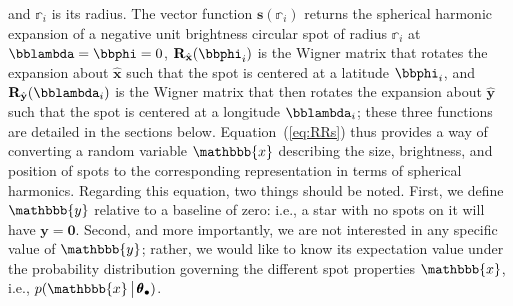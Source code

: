 \documentclass[modern]{aastex62}
\begin{document}
and $\mathbb{r}_i$ is its radius.
The vector function $\mathbf{s}(\mathbb{r}_i)$
returns the spherical harmonic expansion of a negative unit brightness
circular spot of radius $\mathbb{r}_i$ at $\bblambda = \bbphi = 0$,
$\mathbf{R}_{\hat{\mathbf{x}}}(\bbphi_i)$ is the Wigner matrix that rotates the
expansion about $\hat{\mathbf{x}}$ such that the spot is centered at a
latitude $\bbphi_i$, and $\mathbf{R}_{\hat{\mathbf{y}}}(\bblambda_i)$ is the Wigner
matrix that then rotates the
expansion about $\hat{\mathbf{y}}$ such that the spot is centered at a
longitude $\bblambda_i$; these three functions are detailed in the sections below.
%
Equation~(\ref{eq:RRs}) thus provides a way of converting a random variable
$\mathbbb{x}$ describing the size, brightness, and position of spots to the
corresponding representation in terms of spherical harmonics.
%
Regarding this equation,
two things should be noted. First, we define $\mathbbb{y}$ relative to
a baseline of zero: i.e., a star with no spots on it will have
$\mathbf{y} = \mathbf{0}$. Second, and more importantly,
we are not interested in any specific value of
$\mathbbb{y}$; rather, we would like to know its expectation value under
the probability distribution governing the different spot properties $\mathbbb{x}$,
i.e., $p(\mathbbb{x} \, \big| \, \pmb{\theta}_\bullet)$.
%
\end{document}
